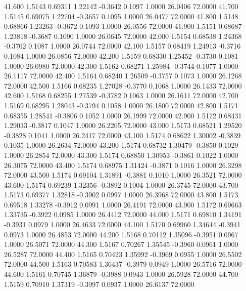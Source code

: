   41.600   1.5143   0.69311   1.22142  -0.3642   0.1097   1.0000  26.0406  72.0000
  41.700   1.5145   0.69075   1.22704  -0.3657   0.1095   1.0000  26.0477  72.0000
  41.800   1.5148   0.68866   1.23263  -0.3672   0.1093   1.0000  26.0556  72.0000
  41.900   1.5151   0.68687   1.23818  -0.3687   0.1090   1.0000  26.0645  72.0000
  42.000   1.5154   0.68538   1.24368  -0.3702   0.1087   1.0000  26.0744  72.0000
  42.100   1.5157   0.68419   1.24913  -0.3716   0.1084   1.0000  26.0856  72.0000
  42.200   1.5159   0.68330   1.25452  -0.3730   0.1081   1.0000  26.0980  72.0000
  42.300   1.5162   0.68271   1.25984  -0.3744   0.1077   1.0000  26.1117  72.0000
  42.400   1.5164   0.68240   1.26509  -0.3757   0.1073   1.0000  26.1268  72.0000
  42.500   1.5166   0.68235   1.27028  -0.3770   0.1068   1.0000  26.1433  72.0000
  42.600   1.5168   0.68255   1.27539  -0.3782   0.1063   1.0000  26.1611  72.0000
  42.700   1.5169   0.68295   1.28043  -0.3794   0.1058   1.0000  26.1800  72.0000
  42.800   1.5171   0.68355   1.28541  -0.3806   0.1052   1.0000  26.1999  72.0000
  42.900   1.5172   0.68431   1.29033  -0.3817   0.1047   1.0000  26.2205  72.0000
  43.000   1.5173   0.68521   1.29520  -0.3828   0.1041   1.0000  26.2417  72.0000
  43.100   1.5174   0.68622   1.30002  -0.3839   0.1035   1.0000  26.2634  72.0000
  43.200   1.5174   0.68732   1.30479  -0.3850   0.1029   1.0000  26.2854  72.0000
  43.300   1.5174   0.68850   1.30953  -0.3861   0.1022   1.0000  26.3075  72.0000
  43.400   1.5174   0.68975   1.31424  -0.3871   0.1016   1.0000  26.3298  72.0000
  43.500   1.5174   0.69104   1.31891  -0.3881   0.1010   1.0000  26.3521  72.0000
  43.600   1.5174   0.69239   1.32356  -0.3892   0.1004   1.0000  26.3745  72.0000
  43.700   1.5173   0.69377   1.32818  -0.3902   0.0997   1.0000  26.3968  72.0000
  43.800   1.5173   0.69518   1.33278  -0.3912   0.0991   1.0000  26.4191  72.0000
  43.900   1.5172   0.69663   1.33735  -0.3922   0.0985   1.0000  26.4412  72.0000
  44.000   1.5171   0.69810   1.34191  -0.3931   0.0979   1.0000  26.4633  72.0000
  44.100   1.5170   0.69960   1.34644  -0.3941   0.0973   1.0000  26.4853  72.0000
  44.200   1.5168   0.70112   1.35096  -0.3951   0.0967   1.0000  26.5071  72.0000
  44.300   1.5167   0.70267   1.35545  -0.3960   0.0961   1.0000  26.5287  72.0000
  44.400   1.5165   0.70423   1.35992  -0.3969   0.0955   1.0000  26.5502  72.0000
  44.500   1.5163   0.70583   1.36437  -0.3979   0.0949   1.0000  26.5716  72.0000
  44.600   1.5161   0.70745   1.36879  -0.3988   0.0943   1.0000  26.5928  72.0000
  44.700   1.5159   0.70910   1.37319  -0.3997   0.0937   1.0000  26.6137  72.0000
